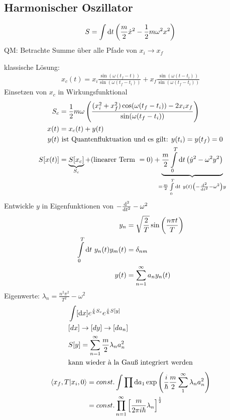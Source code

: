\subsection{Harmonischer Oszillator}
	\begin{align*}
		S = \int \mathrm{d} t \left(
			\frac{m}{2} \dot{x}^2 - \frac{1}{2} m \omega^2 x^2
		\right)
	\end{align*}
QM: Betrachte Summe über alle Pfade von $x_i \rightarrow x_f$ 

klassische Lösung:
	\begin{align*}
		x_c(t) = x_i \frac{\sin (\omega(t_f - t))}{\sin (\omega(t_f - t_i))}
		+ x_f \frac{\sin (\omega(t - t_i))}{\sin (\omega (t_f - t_i))} 
	\end{align*}
Einsetzen von $x_c$ in Wirkungsfunktional 
	\begin{align*}
		S_c &= \frac{1}{2} m \omega 
		\left(
			\frac{(x_i^2 + x_f^2) \cos(\omega(t_f - t_i)) - 2 x_ix_f}{\sin(\omega(t_f - t_i))}
		\right) \\
		x(t) &= x_c(t) + y(t) \\
		y(t) &\text{ ist Quantenfluktuation und es gilt: } y(t_i) = y(t_f) = 0 \\
		S[x(t)] &= \underbrace{S[x_c]}_{\mathclap{S_c}} + 
		(\text{linearer Term } = 0) +
		\underbrace{\frac{m}{2} \int\limits_0^T \diff t \left(\dot{y}^2 - \omega^2 y^2\right)}_{\mathclap{= \frac{m}{2} \int\limits_0^T \diff t~ y(t)\left(-\frac{\diff^2}{\diff t^2} - \omega^2\right)y}}
	\end{align*}
Entwickle $y$ in Eigenfunktionen von $-\frac{\mathrm{d}^2}{\mathrm{d} t^2} - \omega^2$
	\begin{align*}
		y_n &= \sqrt{\frac{2}{T}} \sin \left(\frac{n \pi t}{T}\right) \\
		\int\limits_{0}^T \mathrm{d} t~y_n(t) y_m(t) &= \delta_{nm} \\
		y(t) &= \sum\limits_{n=1}^\infty a_n y_n(t) 
	\end{align*}
Eigenwerte: $\lambda_n=\frac{n^2 \pi^2}{T^2} - \omega^2$
	\begin{align*}
		&\int [\mathrm{d} x] e^{\frac{i}{\hbar} S_c} e^{\frac{i}{\hbar} S[y]} \\
		&[dx] \rightarrow [dy] \rightarrow [d a_n] \\
		&S[y] = \sum_{n = 1}^{\infty} \frac{m}{2} \lambda_n a_n^2 \\
		&\text{kann wieder à la Gauß integriert werden}
	\end{align*}
	\begin{align*}
		\braket{x_f, T | x_i, 0} 
		&= const. \int \prod \mathrm{d} a_1 \exp\left(\frac{i}{\hbar} \frac{m}{2} \sum_{1}^{\infty} \lambda_n a_n^2\right) \\
		&= const. \prod_{n=1}^{\infty}
		\left[
			\frac{m}{2 \pi i \hbar} \lambda_n
		\right]^{\frac{1}{2}} \\
	\end{align*}
